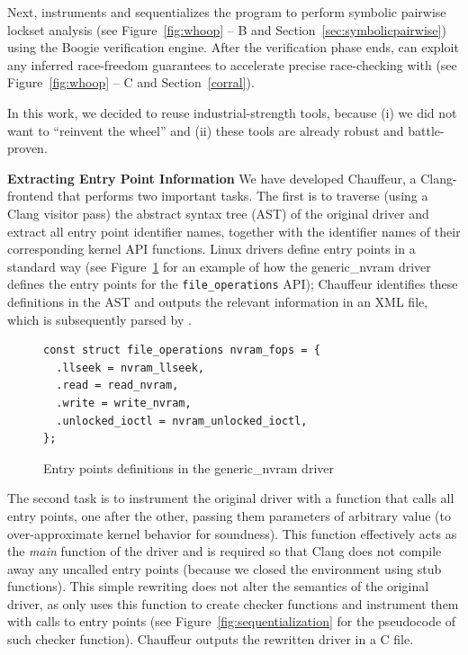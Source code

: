 Next, \whoop instruments and sequentializes the program to perform symbolic pairwise lockset analysis (see Figure~\ref{fig:whoop} -- B and Section~\ref{sec:symbolicpairwise}) using the Boogie verification engine. After the verification phase ends, \whoop can exploit any inferred race-freedom guarantees to accelerate precise race-checking with \corral (see Figure~\ref{fig:whoop} -- C and Section~\ref{corral}).

In this work, we decided to reuse industrial-strength tools, because (i) we did not want to ``reinvent the wheel'' and (ii) these tools are already robust and battle-proven.

\medskip\noindent\textbf{Extracting Entry Point Information }
%
We have developed Chauffeur, a Clang-frontend that performs two important tasks. The first is to traverse (using a Clang visitor pass) the abstract syntax tree (AST) of the original driver and extract all entry point identifier names, together with the identifier names of their corresponding kernel API functions. Linux drivers define entry points in a standard way (see Figure~\ref{fig:entrypoints} for an example of how the generic\_nvram driver defines the entry points for the \texttt{file\_operations} API); Chauffeur identifies these definitions in the AST and outputs the relevant information in an XML file, which is subsequently parsed by \whoop.

\begin{figure}[t]
\begin{lstlisting}
const struct file_operations nvram_fops = {
  .llseek = nvram_llseek,
  .read = read_nvram,
  .write = write_nvram,
  .unlocked_ioctl = nvram_unlocked_ioctl,
};
\end{lstlisting}
\caption{Entry points definitions in the generic\_nvram driver}
\label{fig:entrypoints}
\end{figure}

The second task is to instrument the original driver with a function that calls all entry points, one after the other, passing them parameters of arbitrary value (to over-approximate kernel behavior for soundness). This function effectively acts as the \emph{main} function of the driver and is required so that Clang does not compile away any uncalled entry points (because we closed the environment using stub functions). This simple rewriting does not alter the semantics of the original driver, as \whoop only uses this function to create checker functions and instrument them with calls to entry points (see Figure~\ref{fig:sequentialization} for the pseudocode of such checker function). Chauffeur outputs the rewritten driver in a C file.

